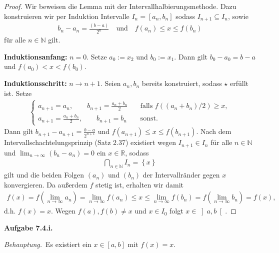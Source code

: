 \documentclass[12pt]{extarticle}
\newcommand{\beh}{\textit{Behauptung.}\ }
\newcommand{\aufgn}[1]{\textbf{Aufgabe #1.}}
\newcommand{\mg}[1]{\mathbb{#1}}
\begin{document}
  \begin{proof}
    Wir beweisen die Lemma mit der
    Intervallhalbierungsmethode.  Dazu konstruieren wir
    per Induktion Intervalle $I_n = \left[ a_n, b_n
    \right]$ sodass \(I_{n+1} \subseteq I_n\), sowie
\begin{align*}
b_n - a_n = \frac{(b-a)}{2^n} \quad \text{und} \quad
  f(a_n) \leq x \leq f(b_n) \tag*{\(\star\)}
\end{align*}
für alle \(n \in \mg{N}\) gilt.

\textbf{Induktionsanfang:} \(n=0.\) Setze \(a_0:=x_2\) und
\(b_0:=x_1\).  Dann gilt \(b_0 - a_0 = b - a\) und
\(f(a_0) < x < f(b_0)\).

\textbf{Induktionsschritt:} \(n \to n+1.\)  Seien $a_n,
b_n$ bereits konstruiert, sodass \(\star\) erfüllt ist.
Setze
\begin{align*}
  \begin{cases}
    a_{n+1} = a_n, \qquad b_{n+1}=\frac{a_n+b_n}{2}
                            \quad & \text{falls } f((a_n+b_n)/2) \ge x,\\
    a_{n+1} = \frac{a_n+b_n}{2}, \qquad b_{n+1}=b_n
                                          \quad &\text{sonst}.
  \end{cases}
\end{align*}
Dann gilt \(b_{n+1}-a_{n+1}=\frac{b-a}{2^{n+1}}\) und
\(f(a_{n+1})\leq x \leq f(b_{n+1})\).  Nach dem
Intervallschachtelungsprinzip (Satz 2.37) existiert
wegen \(I_{n+1} \in I_n\) für alle \(n \in \mg{N}\) und
\(\lim_{n \to \infty}{(b_n - a_n)} = 0\) ein $x \in
\mg{R}$, sodass
\begin{align*}
\bigcap_{n \in \mg{N}}{I_n} = \left\{ x \right\}
\end{align*}
gilt und die beiden Folgen \((a_n)\) und \((b_n)\) der
Intervallränder gegen \(x\) konvergieren.  Da außerdem
\(f\) stetig ist, erhalten wir damit
\begin{align*}
f(x) = f \left( \lim_{n \to \infty}{a_n} \right) =
  \lim_{n \to \infty}{f(a_n)} \leq x \leq \lim_{n \to
  \infty}{f(b_n)} = f \left( \lim_{n \to \infty}{b_n}
  \right) = f(x),
\end{align*}
d.h. \(f(x) = x\).  Wegen \(f(a), f(b) \ne x\) und $x \in
I_0$ folgt \(x \in \left] a, b \right[\).
  \end{proof}

\aufgn{7.4.i}

\beh Es existiert ein \(x \in \left[ a, b \right]\) mit
\(f(x) = x\).
\end{document}

